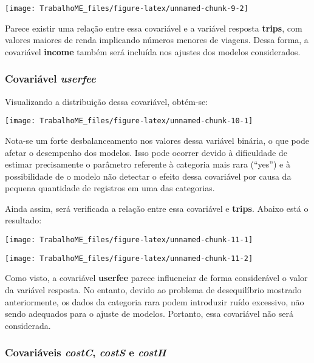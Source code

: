 \documentclass[
  twocolumn]{article}
\begin{document}
\begin{center}\texttt{[image: TrabalhoME\_files/figure-latex/unnamed-chunk-9-2]} \end{center}

Parece existir uma relação entre essa covariável e a variável resposta
\textbf{trips}, com valores maiores de renda implicando números menores
de viagens. Dessa forma, a covariável \textbf{income} também será
incluída nos ajustes dos modelos considerados.

\subsubsection{\texorpdfstring{Covariável
\emph{userfee}}{Covariável userfee}}\label{covariuxe1vel-userfee}

Visualizando a distribuição dessa covariável, obtém-se:

\begin{center}\texttt{[image: TrabalhoME\_files/figure-latex/unnamed-chunk-10-1]} \end{center}

Nota-se um forte desbalanceamento nos valores dessa variável binária, o
que pode afetar o desempenho dos modelos. Isso pode ocorrer devido à
dificuldade de estimar precisamente o parâmetro referente à categoria
mais rara (``yes'') e à possibilidade de o modelo não detectar o efeito
dessa covariável por causa da pequena quantidade de registros em uma das
categorias.

Ainda assim, será verificada a relação entre essa covariável e
\textbf{trips}. Abaixo está o resultado:

\begin{center}\texttt{[image: TrabalhoME\_files/figure-latex/unnamed-chunk-11-1]} \end{center}

\begin{center}\texttt{[image: TrabalhoME\_files/figure-latex/unnamed-chunk-11-2]} \end{center}

Como visto, a covariável \textbf{userfee} parece influenciar de forma
considerável o valor da variável resposta. No entanto, devido ao
problema de desequilíbrio mostrado anteriormente, os dados da categoria
rara podem introduzir ruído excessivo, não sendo adequados para o ajuste
de modelos. Portanto, essa covariável não será considerada.

\subsubsection{\texorpdfstring{Covariáveis \emph{costC}, \emph{costS} e
\emph{costH}}{Covariáveis costC, costS e costH}}\label{covariuxe1veis-costc-costs-e-costh}
\end{document}
